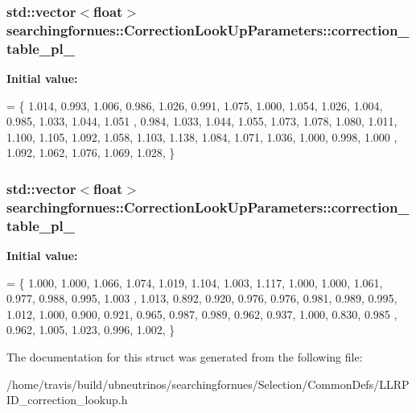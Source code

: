 \subsubsection[{\texorpdfstring{correction\+\_\+table\+\_\+pl\+\_\+1}{correction_table_pl_1}}]{\setlength{\rightskip}{0pt plus 5cm}std\+::vector$<$float$>$ searchingfornues\+::\+Correction\+Look\+Up\+Parameters\+::correction\+\_\+table\+\_\+pl\+\_}\hypertarget{structsearchingfornues_1_1CorrectionLookUpParameters_ad918a3ae6db6714811923e277631618f}{}\label{structsearchingfornues_1_1CorrectionLookUpParameters_ad918a3ae6db6714811923e277631618f}
{\bfseries Initial value\+:}
\begin{DoxyCode}
= \{
    1.014, 0.993, 1.006, 0.986, 1.026, 0.991, 1.075, 1.000, 1.054, 1.026, 1.004, 0.985, 1.033, 1.044, 1.051
      , 0.984, 1.033, 1.044, 1.055, 1.073,
    1.078, 1.080, 1.011, 1.100, 1.105, 1.092, 1.058, 1.103, 1.138, 1.084, 1.071, 1.036, 1.000, 0.998, 1.000
      , 1.092, 1.062, 1.076, 1.069, 1.028,
    \}
\end{DoxyCode}
\subsubsection[{\texorpdfstring{correction\+\_\+table\+\_\+pl\+\_\+2}{correction_table_pl_2}}]{\setlength{\rightskip}{0pt plus 5cm}std\+::vector$<$float$>$ searchingfornues\+::\+Correction\+Look\+Up\+Parameters\+::correction\+\_\+table\+\_\+pl\+\_}\hypertarget{structsearchingfornues_1_1CorrectionLookUpParameters_abbee5a3fe043af403a139e02804189a6}{}\label{structsearchingfornues_1_1CorrectionLookUpParameters_abbee5a3fe043af403a139e02804189a6}
{\bfseries Initial value\+:}
\begin{DoxyCode}
= \{
    1.000, 1.000, 1.066, 1.074, 1.019, 1.104, 1.003, 1.117, 1.000, 1.000, 1.061, 0.977, 0.988, 0.995, 1.003
      , 1.013, 0.892, 0.920, 0.976, 0.976,
    0.981, 0.989, 0.995, 1.012, 1.000, 0.900, 0.921, 0.965, 0.987, 0.989, 0.962, 0.937, 1.000, 0.830, 0.985
      , 0.962, 1.005, 1.023, 0.996, 1.002,
    \}
\end{DoxyCode}


The documentation for this struct was generated from the following file\+:\begin{DoxyCompactItemize}
\item 
/home/travis/build/ubneutrinos/searchingfornues/\+Selection/\+Common\+Defs/L\+L\+R\+P\+I\+D\+\_\+correction\+\_\+lookup.\+h\end{DoxyCompactItemize}
